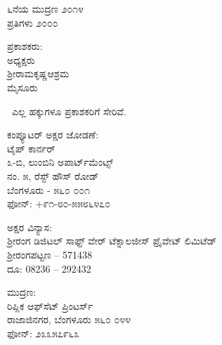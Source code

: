 \thispagestyle{empty}
\begin{flushleft}
{\fontsize{10}{12.5}\selectfont
೬ನೆಯ ಮುದ್ರಣ ೨೦೧೪‍\\
ಪ್ರತಿಗಳು ೨೦೦೦
\vfill

ಪ್ರಕಾಶಕರು:\\
ಅಧ್ಯಕ್ಷರು\\
ಶ್ರೀರಾಮಕೃಷ್ಣಆಶ್ರಮ\\
ಮೈಸೂರು
\vfill

\eng{\copyright}\ ಎಲ್ಲ ಹಕ್ಕುಗಳೂ ಪ್ರಕಾಶಕರಿಗೆ ಸೇರಿವೆ.
\vfill

ಕಂಪ್ಯೂಟರ್ ಅಕ್ಷರ ಜೋಡಣೆ:\\
ಟೈಪ್ ಕಾರ್ನರ್\\
೩-ಬಿ, ಲುಂಬಿನಿ ಅಪಾರ್ಟ್​ಮೆಂಟ್ಸ್\\
ನಂ. ೫, ರೆಸ್ಟ್ ಹೌಸ್ ರೋಡ್\\
ಬೆಂಗಳೂರು - ೫೬೦ ೦೦೧\\
ಫೋನ್: +೯೧-೮೦-೫೫೮೬೪೭೦
\vfill

ಅಕ್ಷರ ವಿನ್ಯಾಸ:\\ಶ‍್ರೀರಂಗ ಡಿಜಿಟಲ್ ಸಾಫ್ಟ್ ‍ವೇರ್ ಟೆಕ್ನಾಲಜೀಸ್ ಪ್ರೈವೇಟ್ ಲಿಮಿಟೆಡ್\\ಶ‍್ರೀರಂಗಪಟ್ಟಣ – 571438\\ದೂ: 08236 – 292432
\vfill

ಮುದ್ರಣ:\\
ರಿಪ್ಲಿಕ ಆಫ್​ಸೆಟ್ ಪ್ರಿಂಟರ್ಸ್\\
ರಾಜಾಜಿನಗರ, ಬೆಂಗಳೂರು ೫೬೦ ೦೪೪\\
ಫೋನ್: ೨೩೩೫೭೯೬೩
}
\end{flushleft}

